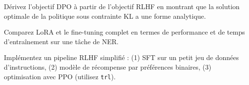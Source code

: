 \begin{exercice}[$\star\star$]
D\'erivez l'objectif DPO \`a partir de l'objectif RLHF en montrant que la
solution optimale de la politique sous contrainte KL a une forme analytique.
\end{exercice}

\begin{exercice}[$\star\star$]
Comparez LoRA et le fine-tuning complet en termes de performance et de temps
d'entra\^inement sur une t\^ache de NER.
\end{exercice}

\begin{exercice}[$\star\star\star$]
Impl\'ementez un pipeline RLHF simplifi\'e : (1) SFT sur un petit jeu de
donn\'ees d'instructions, (2) mod\`ele de r\'ecompense par pr\'ef\'erences
binaires, (3) optimisation avec PPO (utilisez \texttt{trl}).
\end{exercice}
